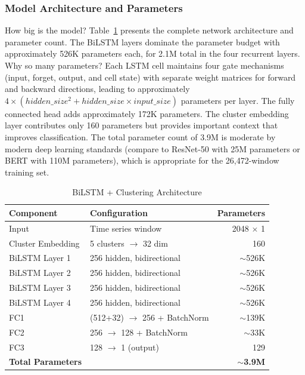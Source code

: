 \documentclass[letterpaper]{article} %
\begin{document}
\subsubsection{Model Architecture and Parameters}
How big is the model? Table~\ref{tab:bilstm_architecture} presents the complete network architecture and parameter count. The BiLSTM layers dominate the parameter budget with approximately 526K parameters each, for 2.1M total in the four recurrent layers. Why so many parameters? Each LSTM cell maintains four gate mechanisms (input, forget, output, and cell state) with separate weight matrices for forward and backward directions, leading to approximately $4 \times (hidden\_size^2 + hidden\_size \times input\_size)$ parameters per layer. The fully connected head adds approximately 172K parameters. The cluster embedding layer contributes only 160 parameters but provides important context that improves classification. The total parameter count of 3.9M is moderate by modern deep learning standards (compare to ResNet-50 with 25M parameters or BERT with 110M parameters), which is appropriate for the 26,472-window training set.

\begin{table}[h]
\centering
\caption{BiLSTM + Clustering Architecture}
\label{tab:bilstm_architecture}
\begin{tabular}{@{}lp{3cm}r@{}}
\toprule
\textbf{Component} & \textbf{Configuration} & \textbf{Parameters} \\
\midrule
Input & Time series window & 2048 $\times$ 1 \\
Cluster Embedding & 5 clusters $\rightarrow$ 32 dim & 160 \\
BiLSTM Layer 1 & 256 hidden, bidirectional & $\sim$526K \\
BiLSTM Layer 2 & 256 hidden, bidirectional & $\sim$526K \\
BiLSTM Layer 3 & 256 hidden, bidirectional & $\sim$526K \\
BiLSTM Layer 4 & 256 hidden, bidirectional & $\sim$526K \\
FC1 & (512+32) $\rightarrow$ 256 + BatchNorm & $\sim$139K \\
FC2 & 256 $\rightarrow$ 128 + BatchNorm & $\sim$33K \\
FC3 & 128 $\rightarrow$ 1 (output) & 129 \\
\midrule
\textbf{Total Parameters} & & \textbf{$\sim$3.9M} \\
\bottomrule
\end{tabular}
\end{table}
\end{document}
